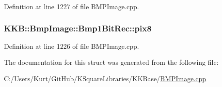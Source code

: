 Definition at line 1227 of file B\+M\+P\+Image.\+cpp.

\subsubsection[{\texorpdfstring{pix8}{pix8}}]{ K\+K\+B\+::\+Bmp\+Image\+::\+Bmp1\+Bit\+Rec\+::pix8}\hypertarget{struct_bmp_image_1_1_bmp1_bit_rec_ac9a3fe73630417f9ac0f4f9d76da609d}{}\label{struct_bmp_image_1_1_bmp1_bit_rec_ac9a3fe73630417f9ac0f4f9d76da609d}


Definition at line 1226 of file B\+M\+P\+Image.\+cpp.



The documentation for this struct was generated from the following file\+:\begin{DoxyCompactItemize}
\item 
C\+:/\+Users/\+Kurt/\+Git\+Hub/\+K\+Square\+Libraries/\+K\+K\+Base/\hyperlink{_b_m_p_image_8cpp}{B\+M\+P\+Image.\+cpp}\end{DoxyCompactItemize}
